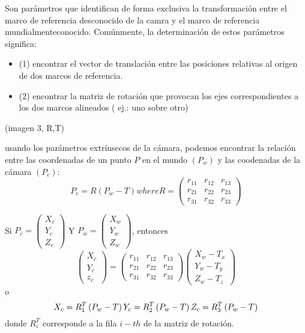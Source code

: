 Son parámetros que identifican de forma exclusiva la transformación entre el marco de referencia desconocido de la camra y el marco de referencia mundialmenteconocido.
Comúnmente, la determinación de estos parámetros significa:
\begin{itemize}
   \item (1) encontrar el vector de translación entre las posiciones relativas al origen de dos marcos de referencia.
   \item (2) encontrar la matriz de rotación que provocan los ejes correspondientes a los dos marcos alineados ( ej.: uno sobre otro)
\end{itemize}

(imagen 3, R,T)

usando los parámetros extrínsecos de la cámara, podemos encontrar la relación entre las coordenadas de un punto $P$ en el mundo $\left(P_w\right)$ y las coodenadas de la cámara $\left(P_c\right)$:
\begin{equation}
		P_c=R\left(P_w-T\right)where R=\begin{pmatrix}
 		r_{11} & r_{12} & r_{13}\\ 
 		r_{21} & r_{22} & r_{23}\\ 
 		r_{31} & r_{32} & r_{33}
 		\end{pmatrix}
\end{equation}

Si $P_c=\begin{pmatrix}{X_c} \\ {Y_c} \\ {Z_c} \end{pmatrix}$ Y $P_w=\begin{pmatrix}{X_w} \\ {Y_w} \\ {Z_w} \end{pmatrix}$, entonces
\begin{equation}
  \begin{pmatrix} X_{c}\\ Y_{c}\\ z_{c}\end{pmatrix} =\begin{pmatrix}r_{11} & r_{12} & r_{13}\\r_{21} & r_{22} & r_{23}\\r_{31} & r_{32} & r_{33}
  \end{pmatrix}\begin{pmatrix}X_{w} - T_{x}\\Y_{w} - T_{y}\\Z_{w} - T_{z}\end{pmatrix}
\end{equation}
o 
\begin{equation}
  X_c=R^{T}_1\left(P_w-T\right)\\ 
  Y_c=R^{T}_2\left(P_w-T\right)\\ 
  Z_c=R^{T}_3\left(P_w-T\right) 
  \end{equation}
donde $R^{T}_i$ corresponde a la fila $i-th$ de la matriz de rotación.

